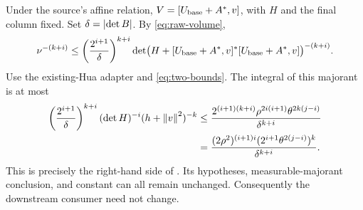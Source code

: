 Under the source's affine relation, \(V=[U_{\rm base}+A^*,v]\), with \(H\) and
the final column fixed. Set \(\delta=\left|\det B\right|\). By \eqref{eq:raw-volume},
\[
 \nu^{-(k+i)}
 \leq \left(\frac{2^{i+1}}{\delta}\right)^{k+i}
       \det\bigl(H+[U_{\rm base}+A^*,v]^*[U_{\rm base}+A^*,v]\bigr)^{-(k+i)}.
\]
Use the existing-Hua adapter and \eqref{eq:two-bounds}. The integral of this
majorant is at most
\begin{align*}
 \left(\frac{2^{i+1}}{\delta}\right)^{k+i}
  (\det H)^{-i}(h+\left\lVert v\right\rVert^2)^{-k}
 &\leq
 \frac{2^{(i+1)(k+i)}\rho^{2i(i+1)}
                    \theta^{2k(j-i)}}{\delta^{k+i}}\\
 &=\frac{(2\rho^2)^{(i+1)i}
               (2^{i+1}\theta^{2(j-i)})^k}{\delta^{k+i}}.
\end{align*}
This is precisely the right-hand side of
. Its hypotheses, measurable-majorant
conclusion, and constant can all remain unchanged. Consequently the downstream
 consumer need not change.
